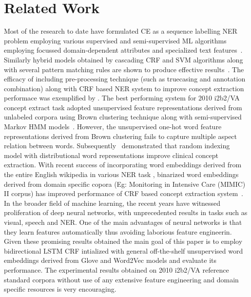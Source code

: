 \section{Related Work}
\label{Sec:Related}

 Most of the research to date have formulated CE as a sequence labelling NER problem employing various supervised and semi-supervised ML algorithms employing focussed domain-dependent attributes and specialized text features~\cite{uzuner20112010}. Similarly hybrid models obtained by cascading CRF and SVM algorithms along with several pattern matching rules are shown to produce effective results~\cite{boagcliner}. The efficacy of including pre-processing technique (such as truecasing and annotation combination) along with CRF based NER system to improve concept extraction performace was exemplified by \cite{fu2014improving}. The best performing system for 2010 i2b2/VA concept extract task adopted unsupervised feature representations  derived from unlabeled corpora using Brown clustering technique along with semi-supervised Markov HMM models~\cite{de2011machine}. However, the unsupervised one-hot word feature representations derived from Brown clustering fails to capture multiple aspect relation between words. Subsequently~\cite{jonnalagadda2012enhancing} demonstrated that random indexing model with distributional word representations  improve clinical concept extraction. With recent success of incorporating word embeddings derived from the entire English wikipedia in various NER task \cite{collobert2011natural}, binarized word embeddings derived from domain specific copora (Eg: Monitoring in Intensive Care (MIMIC) II corpus)  has improved performance of CRF based concept extraction system~\cite{wu2015study}. In the broader field of machine learning, the recent years have witnessed proliferation of  deep neural networks, with unprecedented results in tasks such as visual, speech and NER. One of the main advantages of neural networks is that they learn features automatically thus avoiding laborious feature engineerin. Given these promising results obtained the main goal of this paper is to employ bidirectional LSTM CRF intialized with general off-the-shelf unsupervised word embeddings derived from Glove and Word2Vec models and evaluate its performance. The experimental results obtained on 2010 i2b2/VA reference standard corpora without use of any extensive feature engineering  and domain specific resources is very encouraging.




